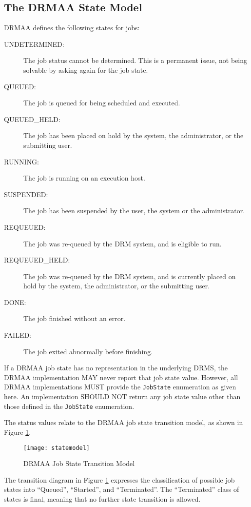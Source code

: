 \documentclass{article}
\newcommand{\h}[1]{\lstinline|#1|}
\begin{document}
\subsection{The DRMAA State Model}
\label{sec:jobstates}

DRMAA defines the following states for jobs:



\begin{description}
\item[UNDETERMINED:] The job status cannot be determined. This is a permanent issue, not being solvable by asking again for the job state.
\item[QUEUED:] The job is queued for being scheduled and executed.
\item[QUEUED\_HELD:] The job has been placed on hold by the system, the administrator, or the submitting user.
\item[RUNNING:] The job is running on an execution host.
\item[SUSPENDED:] The job has been suspended by the user, the system or the administrator.
\item[REQUEUED:] The job was re-queued by the DRM system, and is eligible to run.
\item[REQUEUED\_HELD:] The job was re-queued by the DRM system, and is currently placed on hold by the system, the administrator, or the submitting user.
\item[DONE:] The job finished without an error.
\item[FAILED:] The job exited abnormally before finishing.
\end{description}

If a DRMAA job state has no representation in the underlying DRMS, the DRMAA implementation MAY never report that job state value. However, all DRMAA implementations MUST provide the \h{JobState} enumeration as given here. An implementation SHOULD NOT return any job state value other than those defined in the \h{JobState} enumeration.

The status values relate to the DRMAA job state transition model, as shown in Figure \ref{fig:statemodel}.

\begin{figure}[ht]
\centering
\texttt{[image: statemodel]}
\caption{DRMAA Job State Transition Model}
\label{fig:statemodel}
\end{figure}

The transition diagram in Figure \ref{fig:statemodel} expresses the classification of possible job states into \enquote{Queued}, \enquote{Started}, and \enquote{Terminated}. The \enquote{Terminated} class of states is final, meaning that no further state transition is  allowed. 
\end{document}
